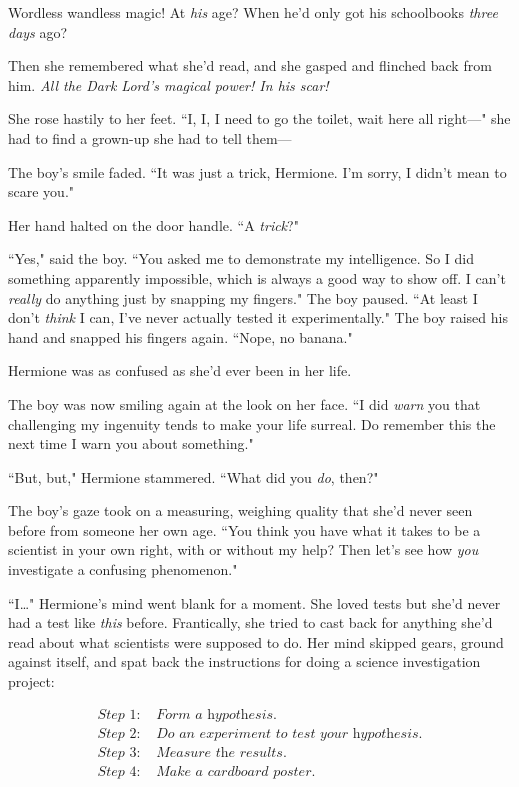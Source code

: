 Wordless wandless magic! At \emph{his} age? When he'd only got his schoolbooks \emph{three days} ago?

Then she remembered what she'd read, and she gasped and flinched back from him. \emph{All the Dark Lord's magical power! In his scar!}

She rose hastily to her feet. ``I, I, I need to go the toilet, wait here all right---" she had to find a grown-up she had to tell them---

The boy's smile faded. ``It was just a trick, Hermione. I'm sorry, I didn't mean to scare you."

Her hand halted on the door handle. ``A \emph{trick}?"

``Yes," said the boy. ``You asked me to demonstrate my intelligence. So I did something apparently impossible, which is always a good way to show off. I can't \emph{really} do anything just by snapping my fingers." The boy paused. ``At least I don't \emph{think} I can, I've never actually tested it experimentally." The boy raised his hand and snapped his fingers again. ``Nope, no banana."

Hermione was as confused as she'd ever been in her life.

The boy was now smiling again at the look on her face. ``I did \emph{warn} you that challenging my ingenuity tends to make your life surreal. Do remember this the next time I warn you about something."

``But, but," Hermione stammered. ``What did you \emph{do}, then?"

The boy's gaze took on a measuring, weighing quality that she'd never seen before from someone her own age. ``You think you have what it takes to be a scientist in your own right, with or without my help? Then let's see how \emph{you} investigate a confusing phenomenon."

``I{\ldots}" Hermione's mind went blank for a moment. She loved tests but she'd never had a test like \emph{this} before. Frantically, she tried to cast back for anything she'd read about what scientists were supposed to do. Her mind skipped gears, ground against itself, and spat back the instructions for doing a science investigation project:

\begin{align*}
\textit{Step 1:}&\textit{ Form a hypothesis.}\\
\textit{Step 2:}&\textit{ Do an experiment to test your hypothesis.}\\
\textit{Step 3:}&\textit{ Measure the results.}\\
\textit{Step 4:}&\textit{ Make a cardboard poster.}
\end{align*}

